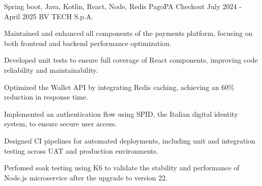 

\begin{cventries}

  \cventry
    {Spring boot, Java, Kotlin, React, Node, Redis} %
    {PagoPA Checkout} %
    {July 2024 - April 2025} %
    {BV TECH S.p.A.} %
    {
      \begin{cvitems} %
        \item {Maintained and enhanced all components of the payments platform, focusing on both frontend and backend performance optimization.}
        \item {Developed unit tests to ensure full coverage of React components, improving code reliability and maintainability.}  
        \item {Optimized the Wallet API by integrating Redis caching, achieving an 60\% reduction in response time.}  
        \item {Implemented an authentication flow using SPID, the Italian digital identity system, to ensure secure user access.}  
        \item {Designed CI pipelines for automated deployments, including unit and integration testing across UAT and production environments.}  
        \item {Perfomed soak testing using K6 to validate the stability and performance of Node.js microservice after the upgrade to version 22.}  
      \end{cvitems}
    }


\end{cventries}

